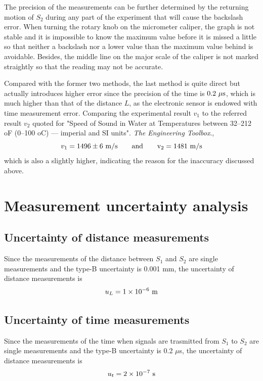 \documentclass[a4paper]{report}
\begin{document}
	The precision of the measurements can be further determined by the returning motion of $S_2$ during any part of the experiment that will cause the backslash error. When turning the rotary knob on the micrometer caliper, the graph is not stable and it is impossible to know the maximum value before it is missed a little so that neither a backslash nor a lower value than the maximum value behind is avoidable. Besides, the middle line on the major scale of the caliper is not marked straightly so that the reading may not be accurate.
	
	Compared with the former two methods, the last method is quite direct but actually introduces higher error since the precision of the time is $0.2\ \mu\rm{s}$, which is much higher than that of the distance $L$, as the electronic sensor is endowed with time measurement error. Comparing the experimental result $v_1$ to the referred result $v_2$ quoted for "Speed of Sound in Water at Temperatures between 32–212 oF (0–100 oC) — imperial and SI units". \textit{The Engineering Toolbox}.,
	\begin{equation*}
	v_1=1496\pm6\ \rm{m/s} \qquad \rm{and} \qquad v_2=1481\ \rm{m/s}
	\end{equation*}
	which is also a slightly higher, indicating the reason for the inaccuracy discussed above.
	\newpage
	\renewcommand\thesection{\Alph{section}}
	\setcounter{section}{0}
	\section{Measurement uncertainty analysis}
	\subsection{Uncertainty of distance measurements}
	Since the measurements of the distance between $S_1$ and $S_2$ are single measurements and the type-B uncertainty is 0.001 mm, the uncertainty of distance measurements is
	\begin{equation*}
	u_L=1\times 10^{-6}\ \rm{m}
	\end{equation*}
	\subsection{Uncertainty of time measurements}
	Since the measurements of the time when signals are trasmitted from $S_1$ to $S_2$ are single measurements and the type-B uncertainty is 0.2 $\mu$s, the uncertainty of distance measurements is
	\begin{equation*}
	u_t=2\times 10^{-7}\ \rm{s}
	\end{equation*}
\end{document}
